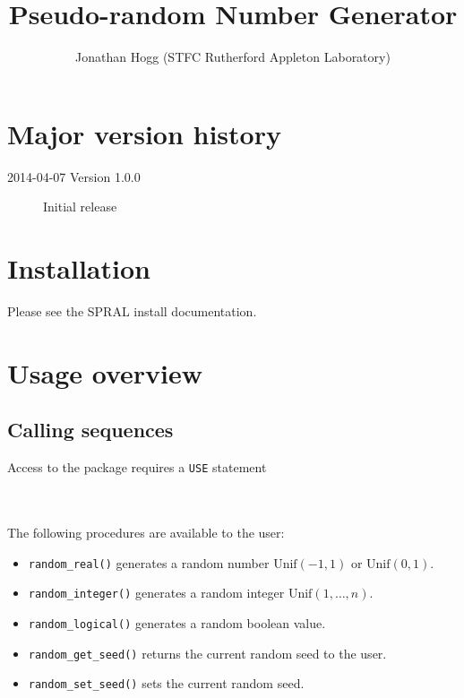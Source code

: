 
\title{Pseudo-random Number Generator}
\author{
   Jonathan Hogg (STFC Rutherford Appleton Laboratory) \\
}
\spralmaketitle
\thispagestyle{firststyle}

\section*{Major version history}
\begin{description}
\item[2014-04-07 Version 1.0.0] Initial release
\end{description}


\section{Installation}
Please see the SPRAL install documentation.


\section{Usage overview}

\subsection{Calling sequences}

Access to the package requires a {\tt USE} statement \\ \\
\indent\hspace{8mm}{\tt use spral\_random} \\

\medskip

\noindent
The following procedures are available to the user:
\begin{itemize}
\item {\tt random\_real()} generates a random number $\mathrm{Unif}(-1,1)$ or
   $\mathrm{Unif}(0,1)$.
\item {\tt random\_integer()} generates a random integer $\mathrm{Unif}(1,\ldots,n)$.
\item {\tt random\_logical()} generates a random boolean value.
\item {\tt random\_get\_seed()} returns the current random seed to the user.
\item {\tt random\_set\_seed()} sets the current random seed.
\end{itemize}

